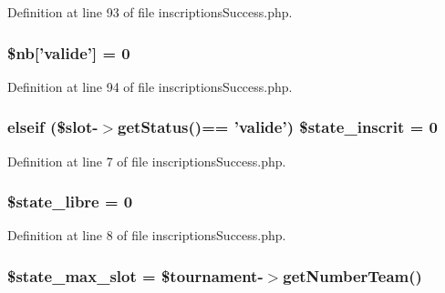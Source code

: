 Definition at line 93 of file inscriptions\-Success.\-php.

\hypertarget{inscriptions_success_8php_ae49886c566173f76a8f27f715e4562fd}{
\subsubsection[{\$nb}]{\setlength{\rightskip}{0pt plus 5cm}\$nb\mbox{[}'valide'\mbox{]} = 0}}\label{inscriptions_success_8php_ae49886c566173f76a8f27f715e4562fd}


Definition at line 94 of file inscriptions\-Success.\-php.

\hypertarget{inscriptions_success_8php_a60be82fa65f561e562585794494783c9}{
\subsubsection[{\$state\-\_\-inscrit}]{\setlength{\rightskip}{0pt plus 5cm}elseif (\$slot-\/$>$get\-Status()== 'valide') \$state\-\_\-inscrit = 0}}\label{inscriptions_success_8php_a60be82fa65f561e562585794494783c9}


Definition at line 7 of file inscriptions\-Success.\-php.

\hypertarget{inscriptions_success_8php_ab312d14793b9c36c5991645be5bf68ad}{
\subsubsection[{\$state\-\_\-libre}]{\setlength{\rightskip}{0pt plus 5cm}\$state\-\_\-libre = 0}}\label{inscriptions_success_8php_ab312d14793b9c36c5991645be5bf68ad}


Definition at line 8 of file inscriptions\-Success.\-php.

\hypertarget{inscriptions_success_8php_a25a9c16257ded9c5abc5490291886b22}{
\subsubsection[{\$state\-\_\-max\-\_\-slot}]{\setlength{\rightskip}{0pt plus 5cm}\$state\-\_\-max\-\_\-slot = \$tournament-\/$>$get\-Number\-Team()}}\label{inscriptions_success_8php_a25a9c16257ded9c5abc5490291886b22}


